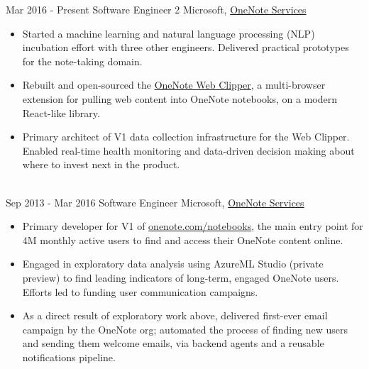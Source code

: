 \documentclass[letterpaper]{twentysecondcv} %
\begin{document}
\begin{twenty} %
\twentyitem
    	{Mar 2016 -}
		{Present}
        {Software Engineer 2}
        {Microsoft, \href{http://www.onenote.com/}{OneNote Services}}
        {}
        {
        {\begin{itemize} \itemsep -2pt %
        \item Started a machine learning and natural language processing (NLP) incubation effort with three other engineers. Delivered practical prototypes for the note-taking domain.
        \item Rebuilt and open-sourced the \href{https://github.com/OneNoteDev/WebClipper}{OneNote Web Clipper}, a multi-browser extension for pulling web content into OneNote notebooks, on a modern React-like library.
        \item Primary architect of V1 data collection infrastructure for the Web Clipper. Enabled real-time health monitoring and data-driven decision making about where to invest next in the product.
    \end{itemize}}
        }
    \\
	\twentyitem
    	{Sep 2013 -}
		{Mar 2016}
        {Software Engineer}
        {Microsoft, \href{http://www.onenote.com/}{OneNote Services}}
        {}
        {
        {\begin{itemize} \itemsep -2pt %
        \item Primary developer for V1 of \href{https://www.onenote.com/notebooks}{onenote.com/notebooks}, the main entry point for 4M monthly active users to find and access their OneNote content online.
        \item Engaged in exploratory data analysis using AzureML Studio (private preview) to find leading indicators of long-term, engaged OneNote users. Efforts led to funding user communication campaigns.
        \item As a direct result of exploratory work above, delivered first-ever email campaign by the OneNote org; automated the process of finding new users and sending them welcome emails, via backend agents and a reusable notifications pipeline.
    \end{itemize}}
        }

\end{twenty}

\end{document}

